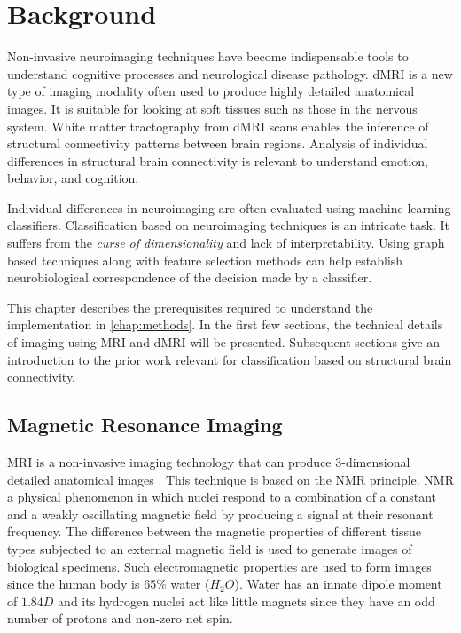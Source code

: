 \documentclass[msthesis.tex]{subfiles}
\begin{document}
\chapter{Background}
Non-invasive neuroimaging techniques have become indispensable tools to understand cognitive processes and neurological disease pathology. \Gls{dMRI} is a new type of imaging modality often used to produce highly detailed anatomical images. It is suitable for looking at soft tissues such as those in the nervous system. White matter tractography from \gls{dMRI} scans enables the inference of structural connectivity patterns between brain regions. Analysis of individual differences in structural brain connectivity is relevant to understand emotion, behavior, and cognition. 

Individual differences in neuroimaging are often evaluated using machine learning classifiers. Classification based on neuroimaging techniques is an intricate task. It suffers from the \textit{curse of dimensionality} and lack of interpretability. Using graph based techniques along with feature selection methods can help establish neurobiological correspondence of the decision made by a classifier. 

This chapter describes the prerequisites required to understand the implementation in \autoref{chap:methods}. In the first few sections, the technical details of imaging using \gls{MRI} and \gls{dMRI} will be presented. Subsequent sections give an introduction to the prior work relevant for classification based on structural brain connectivity.

\section{Magnetic Resonance Imaging}
\gls{MRI} is a non-invasive imaging technology that can produce 3-dimensional detailed anatomical images \citep{mcrobbie_moore_graves_prince_2006}. This technique is based on the \gls{NMR} principle. \Gls{NMR} a physical phenomenon in which nuclei respond to a combination of a constant and a weakly oscillating magnetic field by producing a signal at their resonant frequency. The difference between the magnetic properties of different tissue types subjected to an external magnetic field is used to generate images of biological specimens. Such electromagnetic properties are used to form images since the human body is 65\% water ($H_2O$). Water has an innate dipole moment of $1.84 D$ and its hydrogen nuclei act like little magnets since they have an odd number of protons and non-zero net spin. 
\end{document}
